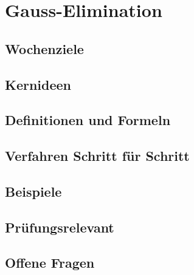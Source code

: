 \chapter{Gauss-Elimination}
\label{kap:02-gauss}

\section*{Wochenziele}
\begin{wochenziele}
\end{wochenziele}

\section{Kernideen}

\section{Definitionen und Formeln}

\section{Verfahren Schritt für Schritt}

\section{Beispiele}

\section{Prüfungsrelevant}

\section{Offene Fragen}
